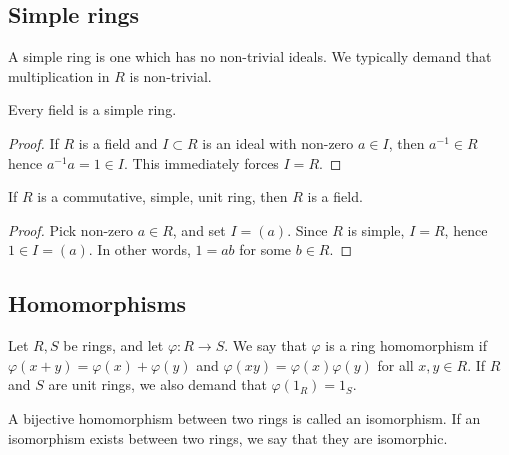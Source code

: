 \documentclass[11pt]{article}
\theoremstyle{definition}
\theoremstyle{remark}
\numberwithin{equation}{section}
\begin{document}
    \subsection{Simple rings}

    \begin{definition}
        A simple ring is one which has no non-trivial ideals. We typically demand
        that multiplication in $R$ is non-trivial.
    \end{definition}

    \begin{lemma}
        Every field is a simple ring.
    \end{lemma}
    \begin{proof}
        If $R$ is a field and $I\subset R$ is an ideal with non-zero $a \in I$, then
        $a^{-1} \in R$ hence $a^{-1}a = 1 \in I$. This immediately forces $I = R$.
    \end{proof}
    \begin{lemma}
        If $R$ is a commutative, simple, unit ring, then $R$ is a field.
    \end{lemma}
    \begin{proof}
        Pick non-zero $a \in R$, and set $I = (a)$. Since $R$ is simple, $I = R$,
        hence $1 \in I = (a)$. In other words, $1 = ab$ for some $b \in R$.
    \end{proof}


    \subsection{Homomorphisms}
    
    \begin{definition}
        Let $R, S$ be rings, and let $\varphi\colon R \to S$. We say that $\varphi$
        is a ring homomorphism if $\varphi(x + y) = \varphi(x) + \varphi(y)$ and
        $\varphi(xy) = \varphi(x)\varphi(y)$ for all $x, y \in R$. If $R$ and $S$ are
        unit rings, we also demand that $\varphi(1_R) = 1_S$.
    \end{definition}

    \begin{definition}
        A bijective homomorphism between two rings is called an isomorphism. If an
        isomorphism exists between two rings, we say that they are isomorphic.
    \end{definition}
\end{document}
